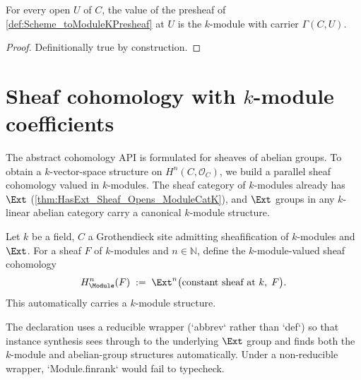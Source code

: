 \begin{lemma}
  \label{lem:Scheme_toModuleKPresheaf_obj}

  For every open \(U\) of \(C\), the value of the presheaf of \cref{def:Scheme_toModuleKPresheaf} at \(U\) is the \(k\)-module with carrier \(\Gamma(C, U)\).
\end{lemma}

\begin{proof}
  
  \leanok
  Definitionally true by construction.
\end{proof}

\section{Sheaf cohomology with \(k\)-module coefficients}
\label{sec:HModule}

The abstract cohomology API is formulated for sheaves of abelian groups. To obtain a \(k\)-vector-space structure on \(H^n(C, \mathcal O_C)\), we build a parallel sheaf cohomology valued in \(k\)-modules. The sheaf category of \(k\)-modules already has \(\Ext\) (\cref{thm:HasExt_Sheaf_Opens_ModuleCatK}), and \(\Ext\) groups in any \(k\)-linear abelian category carry a canonical \(k\)-module structure.

\begin{definition}
  \label{def:Scheme_HModule}

  Let \(k\) be a field, \(C\) a Grothendieck site admitting sheafification of \(k\)-modules and \(\Ext\). For a sheaf \(F\) of \(k\)-modules and \(n \in \mathbb N\), define the \(k\)-module-valued sheaf cohomology
  \[
    H^n_{\Module}(F) \;:=\; \Ext^n\bigl(\text{constant sheaf at }k,\; F\bigr).
  \]
  This automatically carries a \(k\)-module structure.
\end{definition}

\begin{remark}
  The declaration uses a reducible wrapper (`abbrev` rather than `def`) so that instance synthesis sees through to the underlying \(\Ext\) group and finds both the \(k\)-module and abelian-group structures automatically. Under a non-reducible wrapper, `Module.finrank` would fail to typecheck.
\end{remark}

